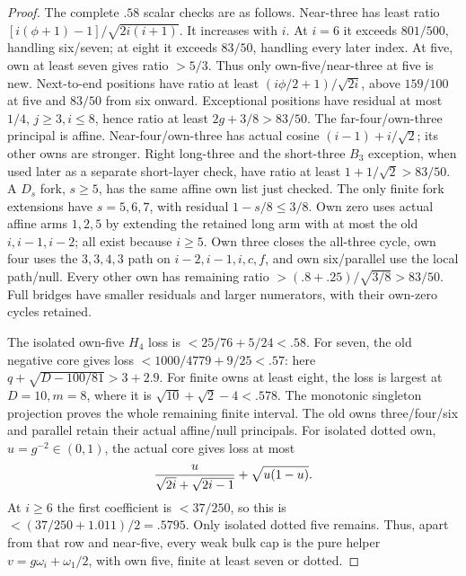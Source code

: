 \documentclass[11pt]{article}
\theoremstyle{definition}
\theoremstyle{remark}
\begin{document}
\begin{proof}
The complete $.58$ scalar checks are as follows. Near-three has
least ratio $[i(\phi+1)-1]/\sqrt{2i(i+1)}$. It increases with $i$.
At $i=6$ it exceeds $801/500$, handling six/seven; at eight it
exceeds $83/50$, handling every later index. At five, own at least
seven gives ratio $>5/3$. Thus only own-five/near-three at five is
new. Next-to-end positions have ratio at least
$(i\phi/2+1)/\sqrt{2i}$, above $159/100$ at five and $83/50$
from six onward. Exceptional positions have residual at most $1/4$,
$j\ge3,i\le8$, hence ratio at least $2g+3/8>83/50$.
The far-four/own-three principal is affine. Near-four/own-three
has actual cosine $(i-1)+i/\sqrt2$; its other owns are stronger.
Right long-three and the short-three $B_3$ exception, when used
later as a separate short-layer check, have ratio
at least $1+1/\sqrt2>83/50$. A $D_s$ fork, $s\ge5$, has the
same affine own list just checked. The only finite fork extensions
have $s=5,6,7$, with residual $1-s/8\le3/8$.
Own zero uses actual affine arms $1,2,5$ by extending the retained
long arm with at most the old $i,i-1,i-2$; all exist because $i\ge5$.
Own three closes the all-three cycle, own four uses the
$3,3,4,3$ path on $i-2,i-1,i,c,f$, and own six/parallel use
the local path/null. Every other own has remaining ratio
$>(.8+.25)/\sqrt{3/8}>83/50$. Full bridges have smaller residuals
and larger numerators, with their own-zero cycles retained.

The isolated own-five $H_4$ loss is $<25/76+5/24<.58$.
For seven, the old negative core gives loss
$<1000/4779+9/25<.57$: here $q+\sqrt{D-100/81}>3+2.9$.
For finite owns at least eight, the loss is largest at $D=10,m=8$,
where it is $\sqrt{10}+\sqrt2-4<.578$. The monotonic singleton
projection proves the whole remaining finite interval. The old
owns three/four/six and parallel retain their actual affine/null
principals. For isolated dotted own, $u=g^{-2}\in(0,1)$, the
actual core gives loss at most
\[
 {u\over\sqrt{2i}+\sqrt{2i-1}}+\sqrt{u(1-u)}.
\]
At $i\ge6$ the first coefficient is $<37/250$, so this is
$<(37/250+1.011)/2=.5795$. Only isolated dotted five remains.
Thus, apart from that row and near-five, every weak bulk cap is
the pure helper $v=g\omega_i+\omega_1/2$, with own five, finite
at least seven or dotted.


\end{proof}
\end{document}
